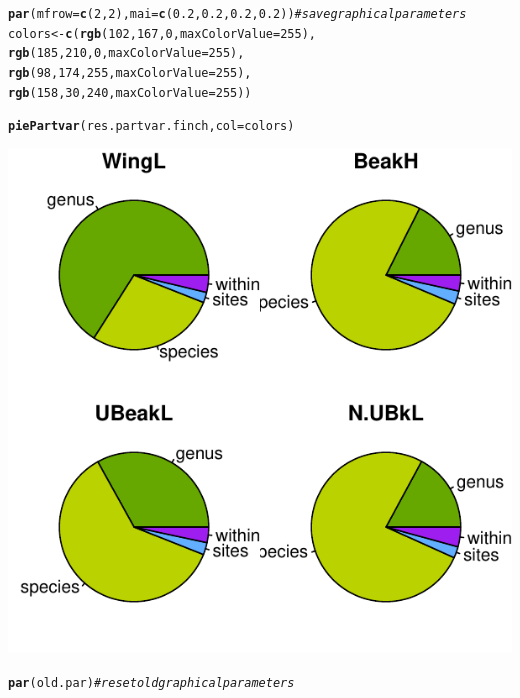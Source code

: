 \documentclass[12pt]{article}\usepackage[]{graphicx}\usepackage[]{color}
\makeatletter
\def\maxwidth{ %
  \ifdim\Gin@nat@width>\linewidth
    \linewidth
  \else
    \Gin@nat@width
  \fi
}
\newcommand{\hlnum}[1]{\textcolor[rgb]{0.686,0.059,0.569}{#1}}%
\newcommand{\hlcom}[1]{\textcolor[rgb]{0.678,0.584,0.686}{\textit{#1}}}%
\newcommand{\hlstd}[1]{\textcolor[rgb]{0.345,0.345,0.345}{#1}}%
\newcommand{\hlkwb}[1]{\textcolor[rgb]{0.69,0.353,0.396}{#1}}%
\newcommand{\hlkwc}[1]{\textcolor[rgb]{0.333,0.667,0.333}{#1}}%
\newcommand{\hlkwd}[1]{\textcolor[rgb]{0.737,0.353,0.396}{\textbf{#1}}}%
\newenvironment{kframe}{%
 \def\at@end@of@kframe{}%
 \ifinner\ifhmode%
  \def\at@end@of@kframe{\end{minipage}}%
  \begin{minipage}{\columnwidth}%
 \fi\fi%
 \def\FrameCommand##1{\hskip\@totalleftmargin \hskip-\fboxsep
 \colorbox{shadecolor}{##1}\hskip-\fboxsep
     \hskip-\linewidth \hskip-\@totalleftmargin \hskip\columnwidth}%
 \MakeFramed {\advance\hsize-\width
   \@totalleftmargin\z@ \linewidth\hsize
   \@setminipage}}%
 {\par\unskip\endMakeFramed%
 \at@end@of@kframe}
\newenvironment{knitrout}{}{} %
\makeatother
\begin{document}
\begin{knitrout}
\color{fgcolor}\begin{kframe}
\begin{alltt}
\hlkwd{par}\hlstd{(}\hlkwc{mfrow} \hlstd{=} \hlkwd{c}\hlstd{(}\hlnum{2}\hlstd{,}\hlnum{2}\hlstd{),} \hlkwc{mai} \hlstd{=} \hlkwd{c}\hlstd{(}\hlnum{0.2}\hlstd{,}\hlnum{0.2}\hlstd{,}\hlnum{0.2}\hlstd{,}\hlnum{0.2}\hlstd{))} \hlcom{#save graphical parameters}
\hlstd{colors}\hlkwb{<-}\hlkwd{c}\hlstd{(}\hlkwd{rgb}\hlstd{(}\hlnum{102}\hlstd{,}\hlnum{167}\hlstd{,}\hlnum{0}\hlstd{,} \hlkwc{maxColorValue} \hlstd{=} \hlnum{255}\hlstd{),}
     \hlkwd{rgb}\hlstd{(}\hlnum{185}\hlstd{,}\hlnum{210}\hlstd{,}\hlnum{0}\hlstd{,} \hlkwc{maxColorValue} \hlstd{=} \hlnum{255}\hlstd{),}
     \hlkwd{rgb}\hlstd{(}\hlnum{98}\hlstd{,}\hlnum{174}\hlstd{,}\hlnum{255}\hlstd{,} \hlkwc{maxColorValue} \hlstd{=} \hlnum{255}\hlstd{),}
     \hlkwd{rgb}\hlstd{(}\hlnum{158}\hlstd{,}\hlnum{30}\hlstd{,}\hlnum{240}\hlstd{,} \hlkwc{maxColorValue} \hlstd{=} \hlnum{255}\hlstd{))}

\hlkwd{piePartvar}\hlstd{(res.partvar.finch,} \hlkwc{col} \hlstd{= colors)}
\end{alltt}
\end{kframe}

{\centering \includegraphics[width=\maxwidth]{figure/unnamed-chunk-25-1} 

}


\begin{kframe}\begin{alltt}
\hlkwd{par}\hlstd{(old.par)} \hlcom{#reset old graphical parameters}
\end{alltt}
\end{kframe}
\end{knitrout}
\end{document}
